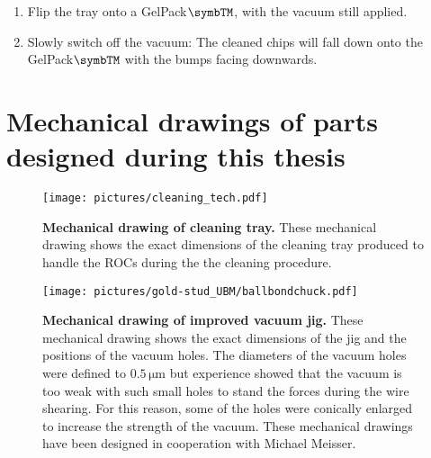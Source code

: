 \begin{appendices}
\begin{enumerate}
\item Flip the tray onto a GelPack$\rm{\symbTM}$, with the vacuum still applied.

\item Slowly switch off the vacuum: The cleaned chips will fall down onto the GelPack$\rm{\symbTM}$ with the bumps facing downwards.

\end{enumerate}
\newpage

\chapter{Mechanical drawings of parts designed during this thesis}

\begin{figure}[h]
\begin{minipage}{.6\textheight} 
\begin{center}
\texttt{[image: pictures/cleaning\_tech.pdf]}
\end{center}
\caption[Mechanical drawing of cleaning tray]{\textbf{Mechanical drawing of cleaning tray.} These mechanical drawing shows the exact dimensions of the cleaning tray produced to handle the \ac{ROC}s during the the cleaning procedure.}\label{App:cleaning_drawings}
\end{minipage}%

\end{figure}



\begin{figure}[h]
\begin{minipage}{.6\textheight} 
\begin{center}
\texttt{[image: pictures/gold-stud\_UBM/ballbondchuck.pdf]}
\end{center}
\caption[Mechanical drawing of improved vacuum jig]{\textbf{Mechanical drawing of improved vacuum jig.} These mechanical drawing shows the exact dimensions of the jig and the positions of the vacuum holes. The diameters of the vacuum holes were defined to $0.5\,\si{\micro \meter}$ but experience showed that the vacuum is too weak with such small holes to stand the forces during the wire shearing. For this reason, some of the holes were conically enlarged to increase the strength of the vacuum. These mechanical drawings have been designed in cooperation with Michael Meisser.}\label{App:vacuum_jig}
\end{minipage}%

\end{figure}


\end{appendices}
